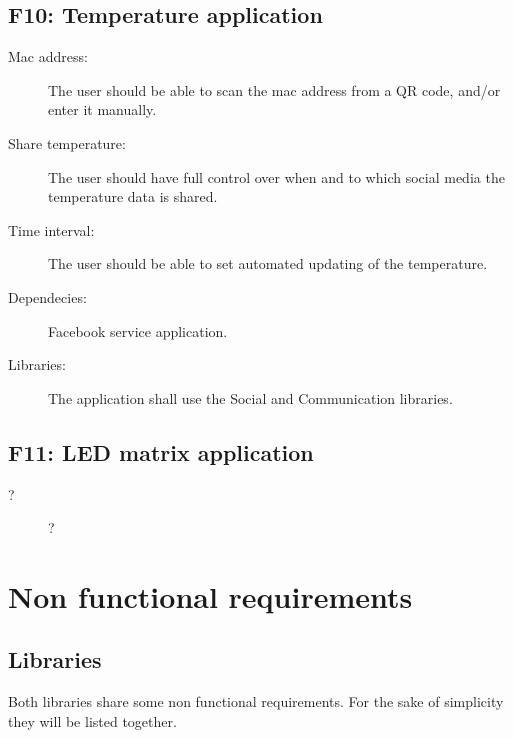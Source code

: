 \subsection{F10: Temperature application}
\begin{description}
	\item[Mac address:] The user should be able to scan the mac address from a QR code, and/or enter it manually. 
	\item[Share temperature:] The user should have full control over when and to which social media the temperature data is shared.
	\item[Time interval:] The user should be able to set automated updating of the temperature.
	\item[Dependecies:] Facebook service application.
	\item[Libraries:] The application shall use the Social and Communication libraries.
\end{description}

\subsection{F11: LED matrix application}
\begin{description}
	\item[?] ?
\end{description}

\newpage

\section{Non functional requirements}

\subsection{Libraries}

Both libraries share some non functional requirements.
For the sake of simplicity they will be listed together.

